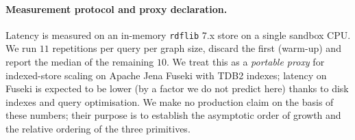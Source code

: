 \documentclass[runningheads]{llncs}
\begin{document}
\paragraph{Measurement protocol and proxy declaration.} Latency is
measured on an in-memory \texttt{rdflib} 7.x store on a single sandbox
CPU. We run $11$ repetitions per query per graph size, discard the
first (warm-up) and report the median of the remaining $10$. We treat
this as a \emph{portable proxy} for indexed-store scaling on Apache
Jena Fuseki with TDB2 indexes; latency on Fuseki is expected to be
lower (by a factor we do not predict here) thanks to disk indexes and
query optimisation. We make no production claim on the basis of these
numbers; their purpose is to establish the asymptotic order of growth
and the relative ordering of the three primitives.

\begin{table}[t]
\centering
\caption{SPARQL scaling on synthetic SEL-aligned graphs. Latency is the
median of $10$ warm runs per query, measured on an in-memory
\texttt{rdflib} store; $|Q_1|$ and $|Q_3|$ are the bindings returned at
each graph size. The table is auto-generated by
\texttt{scripts/sparql\_scaling.py} on an in-memory
\texttt{rdflib}~7.x store; measurements were regenerated for the current
reproducibility repository state and supersede the earlier draft
numbers.}
\label{tab:sparql-scaling}
\small
{}
\end{table}
\end{document}

